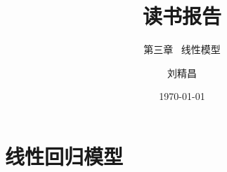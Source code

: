 \documentclass[xetex,mathserif,serif]{beamer}
\begin{document}
\title[机器学习读书会报告] %
{读书报告}
\subtitle{第三章 \ 线性模型}
\author{刘精昌 } %
\date{\today}
\subject{读书会}

\begin{frame}
\titlepage
\end{frame}

\section{线性回归模型}
\end{document}
